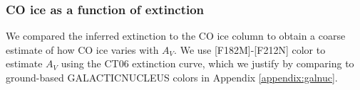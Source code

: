 \documentclass[times,astrosymb,twocolumn]{aastex631}
\def\rr#1{#1}
\begin{document}


\subsubsection{CO ice as a function of extinction}
\label{sec:coicevsext}
We compare\rr{d} the inferred extinction to the CO ice column to obtain a coarse estimate of how CO \rr{ice} varies with $A_V$.
We use [F182M]-[F212N] color to estimate $A_V$ using the CT06 extinction curve, which we justify by comparing to ground-based GALACTICNUCLEUS colors in Appendix \ref{appendix:galnuc}.
\end{document}
